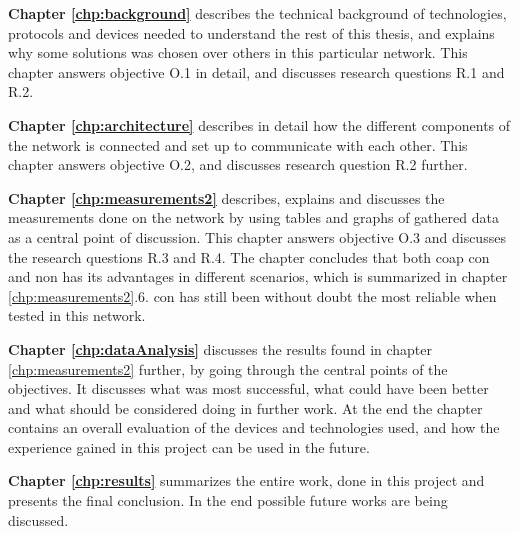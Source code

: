 \noindent \textbf{Chapter \ref{chp:background}} describes the technical background of technologies, protocols and devices needed to understand the rest of this thesis, and explains why some solutions was chosen over others in this particular network. This chapter answers objective O.1 in detail, and discusses research questions R.1 and R.2. 

\noindent \textbf{Chapter \ref{chp:architecture}} describes in detail how the different components of the network is connected and set up to communicate with each other. This chapter answers objective O.2, and discusses research question R.2 further. 

\noindent \textbf{Chapter \ref{chp:measurements2}} describes, explains and discusses the measurements done on the network by using tables and graphs of gathered data as a central point of discussion. This chapter answers objective O.3 and discusses the research questions R.3 and R.4. The chapter concludes that both \gls{coap} \gls{con} and \gls{non} has its advantages in different scenarios, which is summarized in chapter \ref{chp:measurements2}.6. \gls{con} has still been without doubt the most reliable when tested in this network. 

\noindent \textbf{Chapter \ref{chp:dataAnalysis}} discusses the results found in chapter \ref{chp:measurements2} further, by going through the central points of the objectives. It discusses what was most successful, what could have been better and what should be considered doing in further work. At the end the chapter contains an overall evaluation of the devices and technologies used, and how the experience gained in this project can be used in the future. 

\noindent \textbf{Chapter \ref{chp:results}} summarizes the entire work, done in this project and presents the final conclusion. In the end possible future works are being discussed. 





